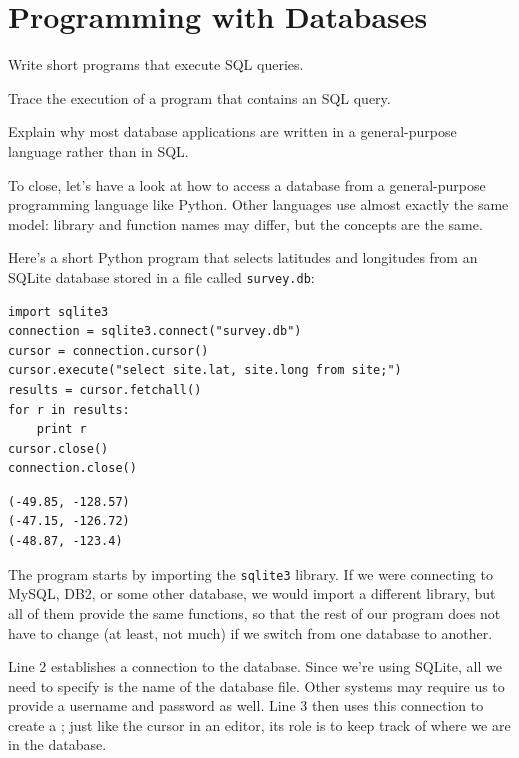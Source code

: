 \documentclass{book}
\begin{document}
\section{Programming with Databases}

\begin{objectives}
\begin{swcitemize}
\item
  Write short programs that execute SQL queries.
\item
  Trace the execution of a program that contains an SQL query.
\item
  Explain why most database applications are written in a
  general-purpose language rather than in SQL.
\end{swcitemize}
\end{objectives}

To close, let's have a look at how to access a database from a
general-purpose programming language like Python. Other languages use
almost exactly the same model: library and function names may differ,
but the concepts are the same.

Here's a short Python program that selects latitudes and longitudes from
an SQLite database stored in a file called \texttt{survey.db}:

\begin{verbatim}
import sqlite3
connection = sqlite3.connect("survey.db")
cursor = connection.cursor()
cursor.execute("select site.lat, site.long from site;")
results = cursor.fetchall()
for r in results:
    print r
cursor.close()
connection.close()
\end{verbatim}

\begin{verbatim}
(-49.85, -128.57)
(-47.15, -126.72)
(-48.87, -123.4)
\end{verbatim}

The program starts by importing the \texttt{sqlite3} library. If we were
connecting to MySQL, DB2, or some other database, we would import a
different library, but all of them provide the same functions, so that
the rest of our program does not have to change (at least, not much) if
we switch from one database to another.

Line 2 establishes a connection to the database. Since we're using
SQLite, all we need to specify is the name of the database file. Other
systems may require us to provide a username and password as well. Line
3 then uses this connection to create a ;
just like the cursor in an editor, its role is to keep track of where we
are in the database.
\end{document}
